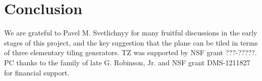 \documentclass[aps,pre,
                showpacs,
                twocolumn,
                groupedaddress,
                floatfix]{revtex4-1}
\begin{document}
\section{Conclusion}


\begin{acknowledgments}
We are grateful to Pavel M. Svetlichnyy for many fruitful discussions in the early stages of this project, and the key suggestion that the plane can be tiled in terms of three elementary tiling generators. TZ was supported by NSF grant ???-?????. PC thanks to the family of late G. Robinson, Jr. and NSF grant DMS-1211827 for financial support.
\end{acknowledgments}

\ifboyscout
\newpage
    
\fi




% 
\end{document}
